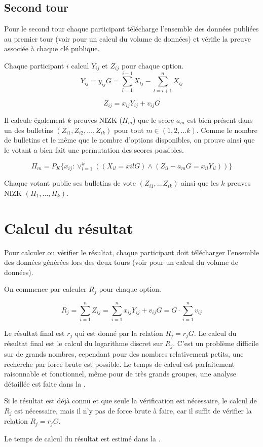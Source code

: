 \documentclass[../report]{subfiles}
\begin{document}
\subsection{Second tour}

Pour le second tour chaque participant télécharge l'ensemble des données publiées au premier 
tour (voir  pour un calcul du volume de données) et vérifie la
preuve associée à chaque clé publique.

Chaque participant $i$ calcul $Y_{ij}$ et $Z_{ij}$ pour chaque option.
\[
	Y_{ij} = y_{ij} G = \sum_{l=1}^{i-1} X_{lj} - \sum_{l=i+1}^{n} X_{lj}
\]

\[
	Z_{ij} = x_{ij} Y_{ij} + v_{ij} G
\]

Il calcule également $k$ preuves NIZK ($\Pi_m$) que le score $a_{m}$ est bien présent dans un des bulletins 
$(Z_{i1}, Z_{i2}, \dots, Z_{ik})$ pour tout $m \in (1, 2, \dots k)$.
Comme le nombre de bulletins et le même que le nombre d'options disponibles, on prouve ainsi
que le votant a bien fait une permutation des scores possibles.

\[
\Pi_m = P_K\{x_{ij}: \vee_{l=1}^{k} ((X_{il} = x{il} G) \wedge (Z_{il} - a_{m}G = x_{il} Y_{il}) )\}
\]

Chaque votant publie ses bulletins de vote $(Z_{i1}, \dots Z_{ik})$ ainsi que les $k$ preuves NIZK $(\Pi_1, \dots, \Pi_k)$.


\section{Calcul du résultat}\label{sec:res:proto:resultat}

Pour calculer ou vérifier le résultat, chaque participant doit télécharger l'ensemble des données générées lors des 
deux tours (voir  pour un calcul du volume de données).

On commence par calculer $R_j$ pour chaque option.

\[
	R_j = \sum_{i=1}^{n} Z_{ij} = \sum_{i=1}^{n} x_{ij}Y_{ij} + v_{ij}G = G \cdot \sum_{i=1}^{n} v_{ij}
\]

Le résultat final est $r_j$ qui est donné par la relation $R_j = r_j G$.
Le calcul du résultat final est le calcul du logarithme discret sur $R_j$.
C'est un problème difficile sur de grands nombres, cependant pour des nombres 
relativement petits, une recherche par force brute est possible.
Le temps de calcul est parfaitement raisonnable et fonctionnel, même pour de très grands groupes, 
une analyse détaillée est faite dans la .

Si le résultat est déjà connu et que seule la vérification est nécessaire, le calcul de $R_j$ est nécessaire, mais il n'y
pas de force brute à faire, car il suffit de vérifier la relation $R_j = r_j G$.

Le temps de calcul du résultat est estimé dans la .
\end{document}
